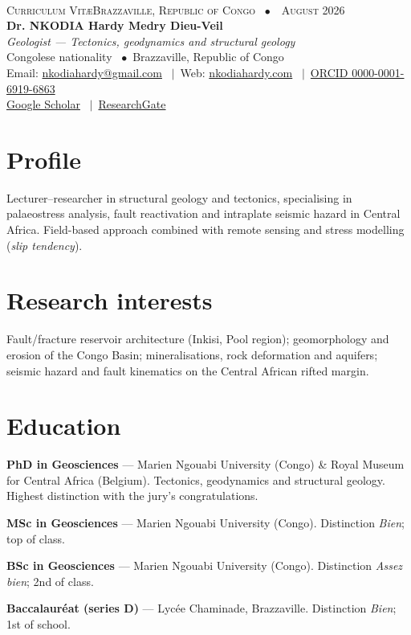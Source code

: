 \documentclass[11pt,a4paper]{article}
\newcommand{\dated}[2]{%
  \noindent\makebox[2.4cm][l]{\small\itshape\color{grey}#1}%
  \parbox[t]{\dimexpr\linewidth-2.4cm\relax}{\small #2}\par\vspace{3pt}}
\begin{document}
\thispagestyle{cvfirst}

\noindent{\color{accent}\rule{\linewidth}{1.3pt}}\\[3.5pt]
{\footnotesize\scshape\color{grey} Curriculum Vit\ae\hfill Brazzaville, Republic of Congo \ $\bullet$\ \ August 2026}\\[5pt]
{\Huge\bfseries\color{accent} Dr. NKODIA Hardy Medry Dieu-Veil}\\[3pt]
{\itshape\color{accent2}\large Geologist — Tectonics, geodynamics and structural geology}\\[5pt]
{\small\color{grey} Congolese nationality \ $\bullet$\ Brazzaville, Republic of Congo}\\[3pt]
{\small Email: \href{mailto:nkodiahardy@gmail.com}{nkodiahardy@gmail.com} \ $\vert$\ Web: \href{https://nkodiahardy.com}{nkodiahardy.com} \ $\vert$\ \href{https://orcid.org/0000-0001-6919-6863}{ORCID 0000-0001-6919-6863}}\\[2pt]
{\small \href{https://scholar.google.com/citations?user=gYOI-FkAAAAJ}{Google Scholar} \ $\vert$\ \href{https://www.researchgate.net/profile/Hardy-Medry-Dieu-Veil-Nkodia}{ResearchGate}}\\[6pt]
\noindent{\color{accent2}\rule{\linewidth}{0.5pt}}

\vspace{4pt}

\section{Profile}
Lecturer--researcher in structural geology and tectonics, specialising in palaeostress analysis, fault reactivation and intraplate seismic hazard in Central Africa. Field-based approach combined with remote sensing and stress modelling (\textit{slip tendency}).

\section{Research interests}
Fault/fracture reservoir architecture (Inkisi, Pool region); geomorphology and erosion of the Congo Basin; mineralisations, rock deformation and aquifers; seismic hazard and fault kinematics on the Central African rifted margin.

\section{Education}
\dated{2019--2024}{\textbf{PhD in Geosciences} — Marien Ngouabi University (Congo) \& Royal Museum for Central Africa (Belgium). Tectonics, geodynamics and structural geology. Highest distinction with the jury's congratulations.}
\dated{2015--2017}{\textbf{MSc in Geosciences} — Marien Ngouabi University (Congo). Distinction \textit{Bien}; top of class.}
\dated{2012--2015}{\textbf{BSc in Geosciences} — Marien Ngouabi University (Congo). Distinction \textit{Assez bien}; 2nd of class.}
\dated{2011}{\textbf{Baccalauréat (series D)} — Lycée Chaminade, Brazzaville. Distinction \textit{Bien}; 1st of school.}
\end{document}
